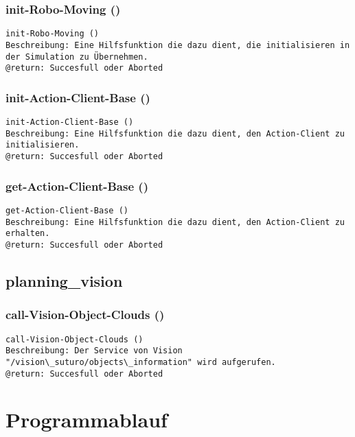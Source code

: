 \documentclass{suturo}
\begin{document}
\subsubsection{init-Robo-Moving ()}
\begin{verbatim}
init-Robo-Moving ()
Beschreibung: Eine Hilfsfunktion die dazu dient, die initialisieren in der Simulation zu Übernehmen.
@return: Succesfull oder Aborted
\end{verbatim}

\subsubsection{init-Action-Client-Base ()}
\begin{verbatim}
init-Action-Client-Base ()
Beschreibung: Eine Hilfsfunktion die dazu dient, den Action-Client zu initialisieren.
@return: Succesfull oder Aborted
\end{verbatim}


\subsubsection{get-Action-Client-Base ()}
\begin{verbatim}
get-Action-Client-Base ()
Beschreibung: Eine Hilfsfunktion die dazu dient, den Action-Client zu erhalten.
@return: Succesfull oder Aborted
\end{verbatim}

\subsection{planning\_vision}

\subsubsection{call-Vision-Object-Clouds ()}
\begin{verbatim}
call-Vision-Object-Clouds ()
Beschreibung: Der Service von Vision  "/vision\_suturo/objects\_information" wird aufgerufen.
@return: Succesfull oder Aborted
\end{verbatim}




\section*{Programmablauf}
\end{document}
